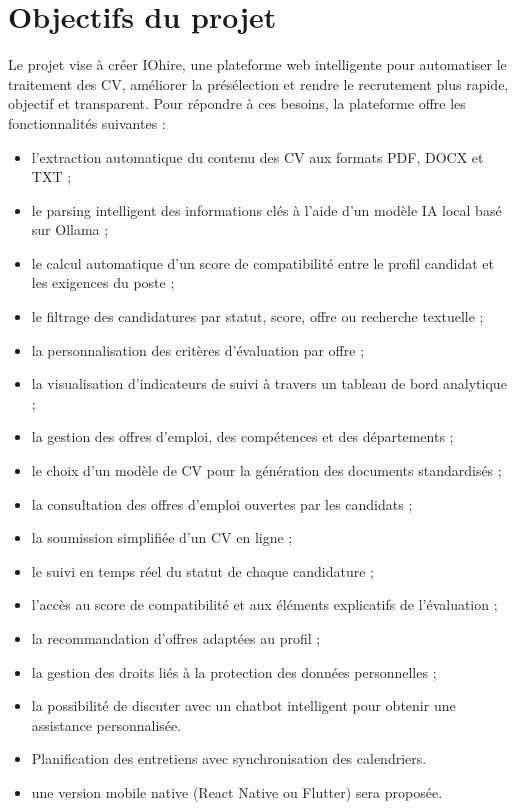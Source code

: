 \documentclass[12pt,a4paper,oneside]{report}
\begin{document}
\begin{itemize}
\begin{longtable}{|p{2.2cm}|p{5.1cm}|p{6cm}|}
\end{longtable}





\section{Objectifs du projet}
Le projet vise à créer IOhire, une plateforme web intelligente pour automatiser le traitement des CV, améliorer la présélection et rendre le recrutement plus rapide, objectif et transparent.
Pour répondre à ces besoins, la plateforme offre les fonctionnalités suivantes :

\renewcommand{\labelitemi}{—}
\begin{itemize}
  \item l’extraction automatique du contenu des CV aux formats PDF, DOCX et TXT ;
  \item le parsing intelligent des informations clés à l’aide d’un modèle IA local basé sur Ollama ;
  \item le calcul automatique d’un score de compatibilité entre le profil candidat et les exigences du poste ;
  \item le filtrage des candidatures par statut, score, offre ou recherche textuelle ;
  \item la personnalisation des critères d’évaluation par offre ;
  \item la visualisation d’indicateurs de suivi à travers un tableau de bord analytique ;
  \item la gestion des offres d’emploi, des compétences et des départements ;
  \item le choix d’un modèle de CV pour la génération des documents standardisés ;
  \item la consultation des offres d’emploi ouvertes par les candidats ;
  \item la soumission simplifiée d’un CV en ligne ;
  \item le suivi en temps réel du statut de chaque candidature ;
  \item l’accès au score de compatibilité et aux éléments explicatifs de l’évaluation ;
  \item la recommandation d’offres adaptées au profil ;
  \item la gestion des droits liés à la protection des données personnelles ;
  \item la possibilité de discuter avec un chatbot intelligent pour obtenir une assistance personnalisée.
  \item Planification des entretiens avec synchronisation des calendriers.
    \item une version mobile native (React Native ou Flutter) sera proposée.


\end{itemize}
\end{itemize}
\end{document}

